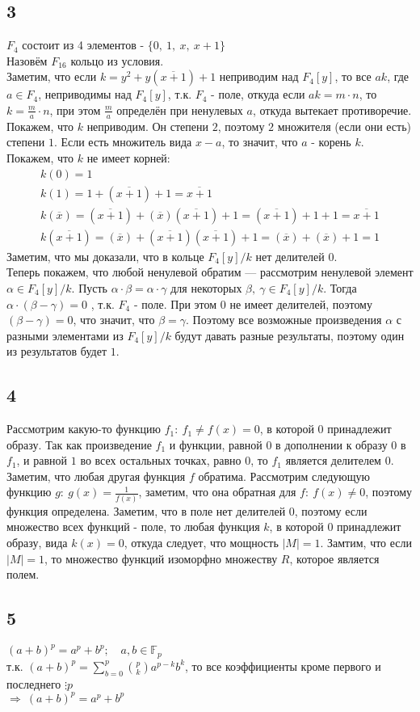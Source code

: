 		\subsection{3}$F_4$ состоит из 4 элементов - $\{ 0,\: 1,\: x,\: x+1 \}$ \\
		Назовём $F_{16}$ кольцо из условия. \\
		Заметим, что если $k = y^2 + y(\overline{x+1}) + 1$ неприводим над $F_4[y]$, то все $ak$, где $a \in F_4$, неприводимы над $F_4[y]$, т.к. $F_4$ - поле, откуда если $ak = m \cdot n$, то $k = \frac{m}{a} \cdot n$, при этом $\frac{m}{a}$ определён при ненулевых $a$, откуда вытекает противоречие.\\
		Покажем, что $k$ неприводим. Он степени $2$, поэтому $2$ множителя (если они есть) степени $1$. Если есть множитель вида $x-a$, то значит, что $a$ - корень $k$. Покажем, что $k$ не имеет корней:\\
		\begin{gather*}
		k(0) = 1  \\
		k(1) = 1 + (\overline{x+1}) + 1 = \overline{x+1} \\
		k(\overline{x}) = (\overline{x+1}) + (\overline{x})(\overline{x+1}) + 1 = (\overline{x+1}) + 1 + 1 = \overline{x+1} \\
		k(\overline{x+1}) = (\overline{x}) + (\overline{x+1})(\overline{x+1}) + 1 = (\overline{x}) + (\overline{x}) + 1 = 1 
		\end{gather*}
		Заметим, что мы доказали, что в кольце $F_4[y]/k$ нет делителей $0$.\\
		Теперь покажем, что любой ненулевой обратим --- рассмотрим ненулевой элемент $\alpha \in F_4[y]/k$. Пусть $\alpha \cdot \beta = \alpha \cdot \gamma$ для некоторых $\beta,\: \gamma \in F_4[y]/k$. Тогда $\alpha \cdot (\beta - \gamma) = 0$ , т.к. $F_4$ - поле. При этом $0$ не имеет делителей, поэтому $(\beta - \gamma) = 0$, что значит, что $\beta = \gamma$. Поэтому все возможные произведения $\alpha$ с разными элементами из $F_4[y]/k$ будут давать разные результаты, поэтому один из результатов будет $1$.
		
		\subsection{4}
		Рассмотрим какую-то функцию $f_1: \ f_1 \ne f(x) = 0$, в которой $0$ принадлежит образу. Так как произведение $f_1$ и функции, равной $0$ в дополнении к образу $0$ в $f_1$, и равной $1$ во всех остальных точках, равно $0$, то $f_1$ является делителем $0$. Заметим, что любая другая функция $f$ обратима. Рассмотрим следующую функцию $g: \ g(x) = \frac{1}{f(x)}$, заметим, что она обратная для $f: \ f(x) \ne 0$, поэтому функция определена. Заметим, что в поле нет делителей $0$, поэтому если множество всех функций - поле, то любая функция $k$, в которой $0$ принадлежит образу, вида $k(x) = 0$, откуда следует, что мощность $|M| = 1$. Замтим, что если $|M| = 1$, то множество функций изоморфно множеству $R$, которое является полем.
		
		\subsection{5}
		$(a + b)^p = a^p + b^p; \quad a,b \in \mathbb{F}_p$\\
		т.к. $(a + b)^p = \sum_{b = 0}^{p} {{p \choose k} a^{p-k} b^{k}}$, то все коэффициенты кроме первого и последнего $\vdots p$\\ 
		$\Rightarrow \: (a + b)^p = a^p + b^p$
